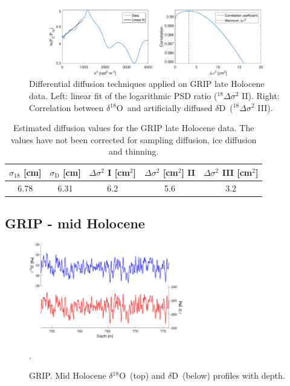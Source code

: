 \documentclass[11pt, draftcls, onecolumn]{IEEEtran} %
\numberwithin{equation}{section}
\numberwithin{table}{section}
\numberwithin{figure}{section}
\newcommand{\delOx}{$\delta{}^{18}\mathrm{O}$}
\newcommand{\delD}{$\delta\mathrm{D}$}
\begin{document}
\begin{appendices}
\begin{figure}[H]
	\vspace*{2mm}
	\begin{center}
		\includegraphics[width=1\textwidth]{Figure_20}
		\caption{Differential diffusion techniques applied on GRIP late Holocene data. 
			Left: linear fit of the logarithmic PSD ratio ($^{18}\Delta\sigma^2$ II). Right: 
			Correlation between \delOx~and artificially diffused \delD~($^{18}\Delta\sigma^2$ III).}  \label{fig:GRIP_late_fig_2}
	\end{center}
\end{figure}

\begin{table}[H]
	\center
	\caption{Estimated diffusion values for the GRIP late Holocene data.
		The values have not been corrected for sampling diffusion, ice diffusion and thinning.}
	\label{GRIP_late_holo}
	\begin{tabular}{c c c c c} 
		\toprule
		$\sigma_{18}$ [cm] & $\sigma_\mathrm{D}$ [cm] & $\Delta\sigma^2$ I [cm$^2$] & $\Delta\sigma^2$ [cm$^2$] II & $\Delta\sigma^2$ III [cm$^2$] \\
		\midrule
6.78 &   6.31 &     6.2 &     5.6 &     3.2 \\
		\bottomrule		
	\end{tabular}
\end{table}

\clearpage
\subsection{GRIP - mid Holocene}

\begin{figure}[H]
	\vspace*{2mm}
	\begin{center}
		\includegraphics[width=0.6\textwidth]{GRIP_mid_holo}
		\caption{GRIP. Mid Holocene \delOx~(top) and \delD~(below) profiles with depth.}  \label{fig:GRIP_mid_holo}.
	\end{center}
\end{figure}


\end{appendices}
\end{document}
